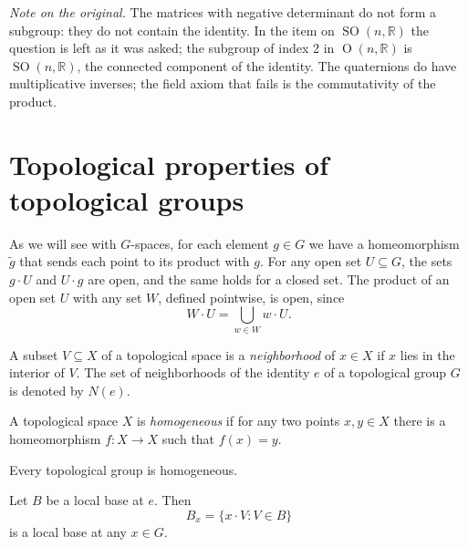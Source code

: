 \noindent
{\it Note on the original.} The matrices
with negative determinant do not form a
subgroup: they do not contain the
identity. In the item on
$\operatorname{SO}(n,\mathbb{R})$ the
question is left as it was asked; the
subgroup of index 2 in
$\operatorname{O}(n,\mathbb{R})$ is
$\operatorname{SO}(n,\mathbb{R})$, the
connected component of the identity. The
quaternions do have multiplicative
inverses; the field axiom that fails is
the commutativity of the product.

\section{Topological properties of
topological groups}
\label{section-topological-properties}

\begin{remark}
\label{remark-translations-open}
As we will see with $G$-spaces, for each
element $g\in G$ we have a
homeomorphism $\tilde{g}$ that sends
each point to its product with $g$. For
any open set $U\subseteq G$, the sets
$g\cdot U$ and $U\cdot g$ are open, and
the same holds for a closed set. The
product of an open set $U$ with any set
$W$, defined pointwise, is open, since
$$
W\cdot U=\bigcup_{w\in W}w\cdot U.
$$
\end{remark}

\begin{definition}
\label{definition-neighborhood}
A subset $V\subseteq X$ of a topological
space is a {\it neighborhood} of
$x\in X$ if $x$ lies in the interior of
$V$. The set of neighborhoods of the
identity $e$ of a topological group $G$
is denoted by $N(e)$.
\end{definition}

\begin{definition}
\label{definition-homogeneous}
A topological space $X$ is
{\it homogeneous} if for any two points
$x,y\in X$ there is a homeomorphism
$f:X\to X$ such that $f(x)=y$.
\end{definition}

\begin{remark}
\label{remark-groups-homogeneous}
Every topological group is homogeneous.
\end{remark}

\begin{proposition}
\label{proposition-local-base-translate}
Let $B$ be a local base at $e$. Then
$$
B_x=\{x\cdot V:V\in B\}
$$
is a local base at any $x\in G$.
\end{proposition}

